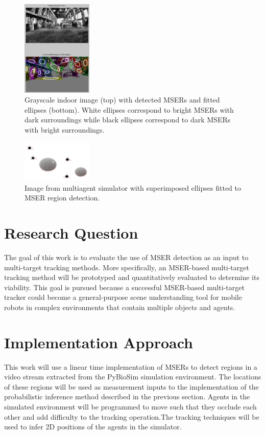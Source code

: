 \documentclass[conference]{IEEEtran}
\begin{document}
\begin{figure}[ht]
\centering
\includegraphics[width=0.3\textwidth]{Ellipses.png}
\caption{Grayscale indoor image (top) with detected MSERs and fitted ellipses (bottom). White ellipses correspond to bright MSERs with dark surroundings while black ellipses correspond to dark MSERs with bright surroundings.}
\label{fig:2}
\vfill
\end{figure} 

\begin{figure}[ht]
\centering
\includegraphics[width=0.3\textwidth]{Simulator.png}
\caption{Image from multiagent simulator with superimposed ellipses fitted to MSER region detection.}
\label{fig:3}
\vfill
\end{figure} 

\section{Research Question}

The goal of this work is to evaluate the use of MSER detection as an input to multi-target tracking methods. More specifically, an MSER-based multi-target tracking method will be prototyped and quantitatively evaluated to determine its viability. This goal is pursued because a successful MSER-based multi-target tracker could become a general-purpose scene understanding tool for mobile robots in complex environments that contain multiple objects and agents. 

\section{Implementation Approach}

This work will use a linear time implementation of MSERs to detect regions in a video stream extracted from the PyBioSim simulation environment. The locations of these regions will be used as measurement inputs to the implementation of the probabilistic inference method described in the previous section. Agents in the simulated environment will be programmed to move such that they occlude each other and add difficulty to the tracking operation.The tracking techniques will be used to infer 2D positions of the agents in the simulator.
\end{document}
